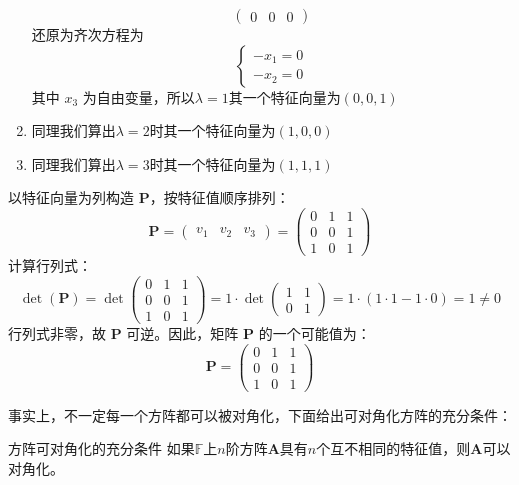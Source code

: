 \begin{example}
\begin{enumerate}
$$\begin{pmatrix}
				0 & 0 & 0
			\end{pmatrix}$$还原为齐次方程为$$\left\{\begin{matrix} 
				-x_1 = 0 \\  
				-x_2 = 0
			\end{matrix}\right. $$ 其中 $x_3$ 为自由变量，所以$\lambda = 1$其一个特征向量为$(0,0,1)$
			\item 同理我们算出$\lambda =2$时其一个特征向量为$(1,0,0)$
			\item 同理我们算出$\lambda =3$时其一个特征向量为$(1,1,1)$
		   	\end{enumerate}
			以特征向量为列构造 $\mathbf{P}$，按特征值顺序排列：$$\mathbf{P} = \begin{pmatrix} v_1 & v_2 & v_3 \end{pmatrix} = \begin{pmatrix} 0 & 1 & 1 \\ 0 & 0 & 1 \\ 1 & 0 & 1 \end{pmatrix}$$计算行列式：$$\det(\mathbf{P}) = \det \begin{pmatrix} 0 & 1 & 1 \\ 0 & 0 & 1 \\ 1 & 0 & 1 \end{pmatrix} = 1 \cdot \det \begin{pmatrix} 1 & 1 \\ 0 & 1 \end{pmatrix} = 1 \cdot (1 \cdot 1 - 1 \cdot 0) = 1 \neq 0$$行列式非零，故 $\mathbf{P}$ 可逆。因此，矩阵 $\mathbf{P}$ 的一个可能值为：$$\mathbf{P}=\begin{pmatrix} 0 & 1 & 1 \\ 0 & 0 & 1 \\ 1 & 0 & 1 \end{pmatrix}$$
\end{example}

事实上，不一定每一个方阵都可以被对角化，下面给出可对角化方阵的充分条件：

\begin{theorem}{方阵可对角化的充分条件}
	\label{the:cfcon}
	如果$\mathbb{F}$上$n$阶方阵$\mathbf{A}$具有$n$个互不相同的特征值，则$\mathbf{A}$可以对角化。
\end{theorem}

